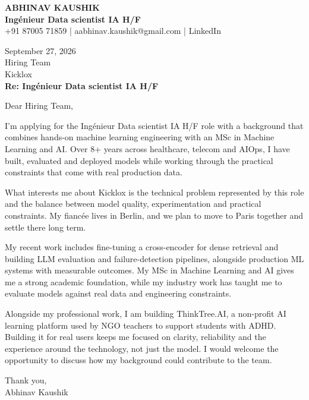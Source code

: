 \documentclass[10pt,a4paper]{article}
\begin{document}
\begin{center}
{\Large\bfseries ABHINAV KAUSHIK}\\[2pt]
{\bfseries Ingénieur Data scientist IA H/F}\\[2pt]
+91 87005 71859 \quad | \quad aabhinav.kaushik@gmail.com \quad | \quad LinkedIn
\end{center}
\vspace{8pt}
September 27, 2026\\[6pt]
Hiring Team\\
Kicklox\\[4pt]
\textbf{Re: Ingénieur Data scientist IA H/F}

Dear Hiring Team,

I’m applying for the Ingénieur Data scientist IA H/F role with a background that combines hands-on machine learning engineering with an MSc in Machine Learning and AI. Over 8+ years across healthcare, telecom and AIOps, I have built, evaluated and deployed models while working through the practical constraints that come with real production data.

What interests me about Kicklox is the technical problem represented by this role and the balance between model quality, experimentation and practical constraints. My fiancée lives in Berlin, and we plan to move to Paris together and settle there long term.

My recent work includes fine-tuning a cross-encoder for dense retrieval and building LLM evaluation and failure-detection pipelines, alongside production ML systems with measurable outcomes. My MSc in Machine Learning and AI gives me a strong academic foundation, while my industry work has taught me to evaluate models against real data and engineering constraints.

Alongside my professional work, I am building ThinkTree.AI, a non-profit AI learning platform used by NGO teachers to support students with ADHD. Building it for real users keeps me focused on clarity, reliability and the experience around the technology, not just the model. I would welcome the opportunity to discuss how my background could contribute to the team.

Thank you,\\
Abhinav Kaushik
\end{document}
